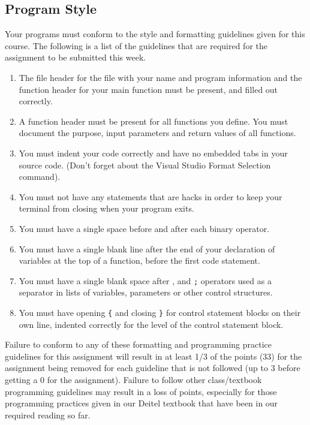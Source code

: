 \documentclass[11pt]{article}
\begin{document}
\subsection*{Program Style}
\label{sec-5-2}

Your programs must conform to the style and formatting guidelines
given for this course.  The following is a list of the guidelines that
are required for the assignment to be submitted this week.

\begin{enumerate}
\item The file header for the file with your name and program information
and the function header for your main function must be present, and
filled out correctly.
\item A function header must be present for all functions you define.
You must document the purpose, input parameters and return values
of all functions.
\item You must indent your code correctly and have no embedded tabs in
your source code. (Don't forget about the Visual Studio Format
Selection command).
\item You must not have any statements that are hacks in order to keep
your terminal from closing when your program exits.
\item You must have a single space before and after each binary operator.
\item You must have a single blank line after the end of your declaration
of variables at the top of a function, before the first code
statement.
\item You must have a single blank space after , and \verb~;~ operators used as a
separator in lists of variables, parameters or other control
structures.
\item You must have opening \verb~{~ and closing \verb~}~ for control statement blocks
on their own line, indented correctly for the level of the control
statement block.
\end{enumerate}

Failure to conform to any of these formatting and programming practice
guidelines for this assignment will result in at least 1/3 of the
points (33) for the assignment being removed for each guideline that
is not followed (up to 3 before getting a 0 for the
assignment). Failure to follow other class/textbook programming
guidelines may result in a loss of points, especially for those
programming practices given in our Deitel textbook that have been in
our required reading so far.
\end{document}
